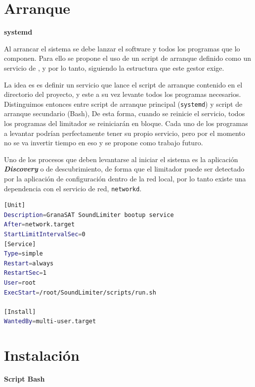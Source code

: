\section{Arranque}

\begin{flushright}
\textbf{systemd}
\end{flushright}

Al arrancar el sistema se debe lanzar el software y todos los programas que lo componen. Para ello se propone el uso de un script de arranque definido como un servicio de  \cite{systemd}, y por lo tanto, siguiendo la estructura que este gestor exige.

La idea es es definir un servicio que lance el script de arranque contenido en el directorio del proyecto, y este a su vez levante todos los programas necesarios. Distinguimos entonces entre script de arranque principal (\texttt{systemd}) y script de arranque secundario (Bash), De esta forma, cuando se reinicie el servicio, todos los programas del limitador se reiniciarán en bloque. Cada uno de los programas a levantar podrían perfectamente tener su propio servicio, pero por el momento no se va invertir tiempo en eso y se propone como trabajo futuro.

Uno de los procesos que deben levantarse al iniciar el sistema es la aplicación \textit{\textbf{Discovery}} o de descubrimiento, de forma que el limitador puede ser detectado por la aplicación de configuración dentro de la red local, por lo tanto existe una dependencia con el servicio de red, \texttt{networkd}.
\newpage

\begin{lstlisting}[language=sh, caption={Ejemplo de servicio de arranque para el \acrshort{LM11}}, label={lst:lms11-boot}]
[Unit]
Description=GranaSAT SoundLimiter bootup service
After=network.target
StartLimitIntervalSec=0
[Service]
Type=simple
Restart=always
RestartSec=1
User=root
ExecStart=/root/SoundLimiter/scripts/run.sh

[Install]
WantedBy=multi-user.target
\end{lstlisting}

\section{Instalación}

\begin{flushright}
\textbf{Script Bash}
\end{flushright}

